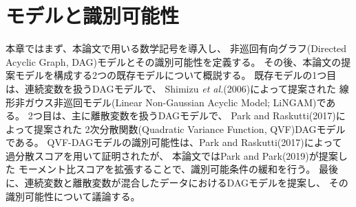 \section{モデルと識別可能性}
\label{part:model}

本章ではまず、本論文で用いる数学記号を導入し、
非巡回有向グラフ(Directed Acyclic Graph, DAG)モデルとその識別可能性を定義する。
その後、本論文の提案モデルを構成する2つの既存モデルについて概説する。
既存モデルの1つ目は、連続変数を扱うDAGモデルで、
Shimizu \textit{et al.}(2006)\cite{Shimizu2006-yu}によって提案された
線形非ガウス非巡回モデル(Linear Non-Gaussian Acyclic Model; LiNGAM)である。
2つ目は、主に離散変数を扱うDAGモデルで、
Park and Raskutti(2017)\cite{Park2017-hw}によって提案された
2次分散関数(Quadratic Variance Function, QVF)DAGモデルである。
QVF-DAGモデルの識別可能性は、Park and Raskutti(2017)\cite{Park2017-hw}によって
過分散スコアを用いて証明されたが、
本論文ではPark and Park(2019)\cite{Park2019-qy}が提案した
モーメント比スコアを拡張することで、識別可能条件の緩和を行う。
最後に、連続変数と離散変数が混合したデータにおけるDAGモデルを提案し、
その識別可能性について議論する。

%

%

%

%

%

